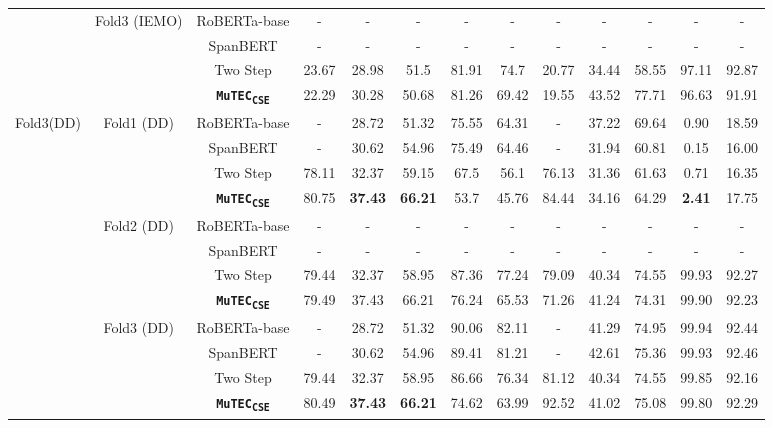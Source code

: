 \documentclass{article}
\newcommand{\subone}{\textbf{\texttt{MuTEC\textsubscript{CSE}}}}
\begin{document}
{\begin{table*}[!t]
{\begin{tabular}{|c|c|c|c|c|c|c|c|c|c|c|c|c|}
\cline{2-13} 
& \multirow{4}{*}{Fold3 (IEMO)} 
& RoBERTa-base  & 
- &    -   & -     & -     & -     & - &  -     & -     & -     & -     \\ \cline{3-13} 
& & SpanBERT &
- &    -   & -     & -     & -     & - & -      & -     & -     & -     \\ \cline{3-13} 
& & Two Step    &
23.67 & 28.98 & 51.5 & 81.91 & 74.7 & 20.77 & 34.44  & 58.55 & 97.11 & 92.87 \\ 
\cline{3-13} 
& & \subone    &
22.29 & 30.28 & 50.68 & 81.26 & 69.42 & 19.55 & 43.52  & 77.71 & 96.63 & 91.91 \\ 
\hline
\multirow{24}{*}{Fold3(DD)} & \multirow{3}{*}{Fold1 (DD)}   & RoBERTa-base  & 
- & 28.72 & 51.32 & 75.55 & 64.31 & - & 37.22 & 69.64 & 0.90 & 18.59 \\ 
\cline{3-13} 
&    & SpanBERT & 
- & 30.62 & 54.96 & 75.49 & 64.46 & - & 31.94 & 60.81 & 0.15 & 16.00      \\ 
\cline{3-13} 
&  & Two Step &      
78.11 &  32.37 & 59.15 & 67.5  & 56.1 &  76.13 &  31.36 & 61.63 & 0.71 & 16.35  \\ 
\cline{3-13} 
&  & \subone &      
80.75 &  \textbf{37.43} & \textbf{66.21} & 53.7  & 45.76 &  84.44 &  34.16 & 64.29 & \textbf{2.41} & 17.75  \\ 
\cline{2-13} 
& \multirow{3}{*}{Fold2 (DD)}  
& RoBERTa-base  & 
- & -  & -     & -     & -     & -  &  -     & -     & -     & -     \\ \cline{3-13} 
&  & SpanBERT & 
- &     -  & -     & -     & -     & - &   -    & -     & -     & -   \\ \cline{3-13} 
&  & Two Step  &  
79.44 & 32.37 &  58.95 &    87.36   & 77.24  &  79.09   & 40.34 & 74.55 & 99.93   &     92.27  \\
\cline{3-13} 
&  & \subone  &  
79.49 & 37.43 &  66.21 & 76.24 & 65.53  &  71.26  & 41.24 & 74.31 & 99.90  &  92.23 \\
\cline{2-13} 
& \multirow{3}{*}{Fold3 (DD)} 
& RoBERTa-base  & 
- & 28.72 & 51.32 & 90.06 & 82.11 & - & 41.29 & 74.95 & 99.94 & 92.44     \\ \cline{3-13} 
&  & SpanBERT & 
- &  30.62 & 54.96 & 89.41 & 81.21 & - & 42.61 & 75.36 & 99.93 & 92.46    \\ \cline{3-13} 
&  & Two Step &     
79.44 & 32.37 & 58.95   & 86.66  & 76.34 & 81.12  &  40.34 &  74.55 & 99.85    &  92.16     \\ 
\cline{3-13} 
&  & \subone &     
80.49 & \textbf{37.43} & \textbf{66.21} & 74.62 & 63.99 & 92.52  &  41.02 &  75.08 & 99.80    &  92.29     \\

\end{tabular}}
\end{table*}}
\end{document}
